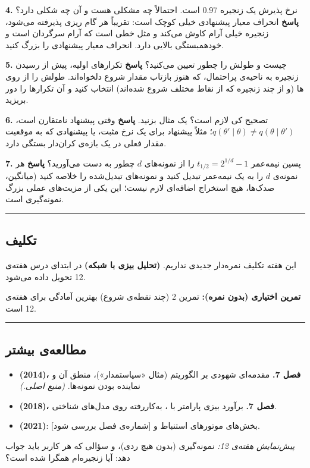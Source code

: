 \textbf{4.} نرخ پذیرش یک زنجیره 0.97 است. احتمالاً چه مشکلی هست و
 آن چه شکلی دارد؟ \textbf{پاسخ} انحراف معیار پیشنهادی خیلی
کوچک است: تقریباً هر گام ریزی پذیرفته می‌شود، زنجیره خیلی آرام کاوش می‌کند
و  مثل خطی است که آرام سرگردان است و خودهمبستگی بالایی دارد.
انحراف معیار پیشنهادی را بزرگ کنید.

\textbf{5.}  چیست و طولش را چطور تعیین می‌کنید؟ \textbf{پاسخ}
تکرارهای اولیه، پیش از رسیدن زنجیره به ناحیه‌ی پراحتمال، که هنوز بازتاب
مقدار شروع دلخواه‌اند. طولش را از روی ها (و از چند زنجیره
که از نقاط مختلف شروع شده‌اند) انتخاب کنید و آن تکرارها را دور بریزید.

\textbf{6.} تصحیح  کی لازم است؟ یک مثال بزنید.
\textbf{پاسخ} وقتی پیشنهاد نامتقارن است،
\(q(\theta'\mid\theta) \ne q(\theta\mid\theta')\)؛ مثلاً پیشنهاد
 برای یک نرخ مثبت، یا پیشنهادی که به موقعیت مقدار فعلی در
یک بازه‌ی کران‌دار بستگی دارد.

\textbf{7.} پسین نیمه‌عمر \(t_{1/2} = 2^{1/d} - 1\) را از نمونه‌های
 \(d\) چطور به دست می‌آورید؟ \textbf{پاسخ} هر نمونه‌ی \(d\) را به
یک نیمه‌عمر تبدیل کنید و نمونه‌های تبدیل‌شده را خلاصه کنید (میانگین، صدک‌ها،
 هیچ استخراج اضافه‌ای لازم نیست؛ این یکی از مزیت‌های عملی بزرگ
نمونه‌گیری است.

\begin{center}\rule{0.5\linewidth}{0.5pt}\end{center}

\subsection{تکلیف}

این هفته تکلیف نمره‌دار جدیدی نداریم. \textbf{ (تحلیل بیزی با
شبکه)} در ابتدای درس هفته‌ی 12 تحویل داده می‌شود.

\textbf{تمرین اختیاری (بدون نمره):} تمرین 2 (چند نقطه‌ی شروع) بهترین
آمادگی برای هفته‌ی 12 است.

\begin{center}\rule{0.5\linewidth}{0.5pt}\end{center}

\subsection{مطالعه‌ی بیشتر}

\begin{itemize}
\tightlist
\item
  \textbf{ (2014)، فصل 7.} 
  مقدمه‌ای شهودی بر الگوریتم  (مثال «سیاستمدار»)، منطق آن
  و نماینده بودن نمونه‌ها. \emph{(منبع اصلی.)}
\item
  \textbf{ \lr{\&}  (2018)، فصل 7.} برآورد بیزی
  پارامتر با ، به‌کاررفته روی مدل‌های شناختی.
\item
  \textbf{ \lr{\&}  (2021)}: بخش‌های موتورهای
  استنباط و  {[}شماره‌ی فصل بررسی شود{]}.
\end{itemize}

\emph{پیش‌نمایش هفته‌ی 12:} نمونه‌گیری  (بدون هیچ ردی)، و سؤالی
که هر کاربر  باید جواب دهد: آیا زنجیره‌ام همگرا شده است؟
